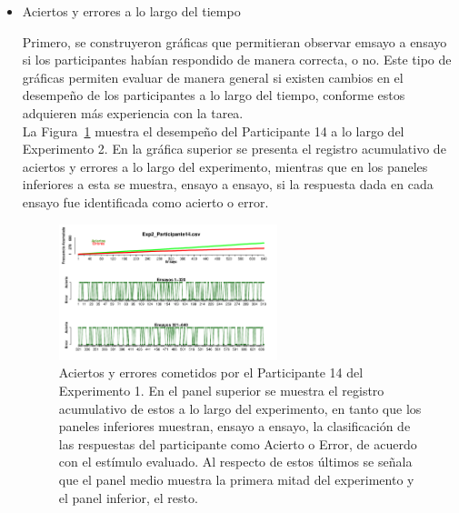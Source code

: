 \begin{itemize}
\item Aciertos y errores a lo largo del tiempo

Primero, se construyeron gráficas que permitieran observar emsayo a ensayo si los participantes habían respondido de manera correcta, o no. Este tipo de gráficas permiten evaluar de manera general si existen cambios en el desempeño de los participantes a lo largo del tiempo, conforme estos adquieren más experiencia con la tarea.\\

La Figura~\ref{fig:Success_E1_P14} muestra el desempeño del Participante 14 a lo largo del Experimento 2. En la gráfica superior se presenta el registro acumulativo de aciertos y errores a lo largo del experimento, mientras que en los paneles inferiores a esta se muestra, ensayo a ensayo, si la respuesta dada en cada ensayo fue identificada como acierto o error.\\


\begin{figure}[th]
\centering
\includegraphics[width=0.60\textwidth]{Figures/Success_Exp2_P14}
\caption[Aciertos y errores a lo largo del tiempo: Participante ejemplar]{Aciertos y errores cometidos por el Participante 14 del Experimento 1. En el panel superior se muestra el registro acumulativo de estos a lo largo del experimento, en tanto que los paneles inferiores muestran, ensayo a ensayo, la clasificación de las respuestas del participante como Acierto o Error, de acuerdo con el estímulo evaluado. Al respecto de estos últimos se señala que el panel medio muestra la primera mitad del experimento y el panel inferior, el resto.}
\label{fig:Success_E1_P14}
\end{figure}




\end{itemize}
